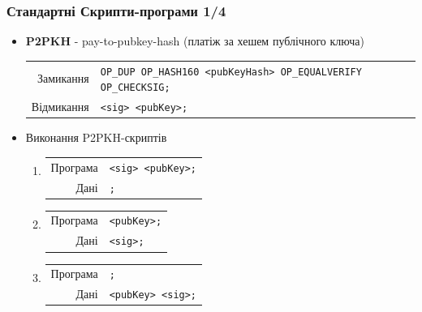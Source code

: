 \documentclass{beamer}
\begin{document}
\begin{frame}[fragile]
  \frametitle{Стандартні Скрипти-програми 1/4}
  \begin{itemize}
  \item \textbf{P2PKH} - pay-to-pubkey-hash (платіж за хешем публічного ключа)
    \break
    \begin{tabular}{rl}
      Замикання &\tiny\texttt{OP_DUP OP_HASH160 <pubKeyHash> OP_EQUALVERIFY OP_CHECKSIG;} \\
      Відмикання &\tiny\texttt{<sig> <pubKey>;} \\
    \end{tabular}
  \item Виконання P2PKH-скриптів
    \begin{enumerate}
    \item
      \begin{tabular}{rl}
        Програма &\tiny\texttt{<sig> <pubKey>;} \\
        Дані &\tiny\texttt{;} \\
      \end{tabular}
    \item
      \begin{tabular}{rl}
        Програма &\tiny\texttt{<pubKey>;} \\
        Дані &\tiny\texttt{<sig>;} \\
      \end{tabular}
    \item
      \begin{tabular}{rl}
        Програма &\tiny\texttt{;} \\
        Дані &\tiny\texttt{<pubKey> <sig>;} \\
      \end{tabular}
    \end{enumerate}
  \end{itemize}
\end{frame}
\end{document}
